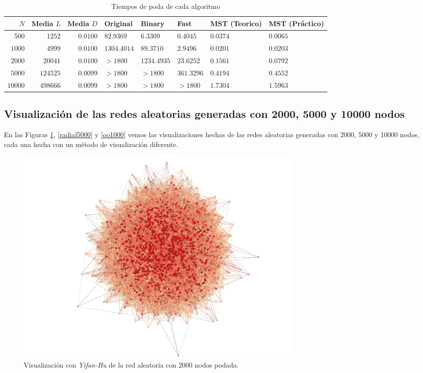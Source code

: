 \documentclass[10pt,a4paper,spanish]{article}
\numberwithin{equation}{section} %
\numberwithin{figure}{section} %
\numberwithin{table}{section} %
\begin{document}
\begin{table}[!h]
\begin{tabular}{rrrlllll}
\hline
    $N$ &    Media $L$ &   Media $D$ & Original             & Binary               & Fast                 & MST (Teorico)          & MST (Práctico)         \\
\hline
$500$ &   $1252$ & $0.0100$  & $82.9369$  & $6.3309$  & $0.4045$ & $0.0374$ & $0.0065$ \\
$1000$ & $4999$ & $0.0100$   &       $1304.4014$ & $89.3710$  & $2.9496$ & $0.0201$  & $0.0203$ \\
$2000$ &  $20041$ & $0.0100$  &       $> 1800$ & $1234.4935$ & $23.6252$ & $0.1561$  & $0.0792$  \\
$5000$ & $124525$ & $0.0099$ & $> 1800$ & $> 1800$ & $361.3296$   & $0.4194$   & $0.4552$   \\
$10000$ & $498666$ & $0.0099$ & $> 1800$ & $> 1800$ & $> 1800$ & $1.7304$   & $1.5963$    \\
\hline
\end{tabular}
\caption{Tiempos de poda de cada algoritmo}
\label{tiempopoda}
\end{table}

\subsection{Visualización de las redes aleatorias generadas con 2000, 5000 y 10000 nodos}

En las Figuras \hyperref[yh2000]{\ref*{yh2000}}, \hyperref[radial5000]{\ref*{radial5000}} y \hyperref[oo1000]{\ref*{oo1000}} vemos las visualizaciones hechas de las redes aleatorias generadas con 2000, 5000 y 10000 nodos, cada una hecha con un método de visualización diferente.

\begin{figure}[!h]
  \centering
  \includegraphics[width=0.7\textwidth]{../visualizacion/2000_yf}
  \caption{Visualización con \textit{Yifan-Hu} de la red aleatoria con 2000 nodos podada.}
  \label{yh2000}
\end{figure}
\end{document}
